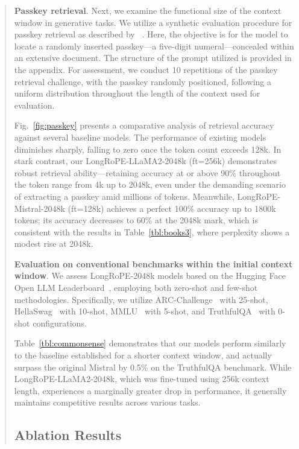 \begin{abstract}
\textbf{Passkey retrieval}. Next, we examine the functional size of the context window in generative tasks. We utilize a synthetic evaluation procedure for passkey retrieval as described by ~\cite{passkey}. Here, the objective is for the model to locate a randomly inserted passkey—a five-digit numeral—concealed within an extensive document. The structure of the prompt utilized is provided in the appendix. For assessment, we conduct 10 repetitions of the passkey retrieval challenge, with the passkey randomly positioned, following a uniform distribution throughout the length of the context used for evaluation.

Fig.~\ref{fig:passkey} presents a comparative analysis of retrieval accuracy against several baseline models. The performance of existing models diminishes sharply, falling to zero once the token count exceeds 128k. In stark contrast, our LongRoPE-LLaMA2-2048k (ft=256k) demonstrates robust retrieval ability—retaining accuracy at or above 90\% throughout the token range from 4k up to 2048k, even under the demanding scenario of extracting a passkey amid millions of tokens. Meanwhile, LongRoPE-Mistral-2048k (ft=128k) achieves a perfect 100\% accuracy up to 1800k tokens; its accuracy decreases to 60\% at the 2048k mark, which is consistent with the results in Table~\ref{tbl:books3}, where perplexity shows a modest rise at 2048k.

\textbf{Evaluation on conventional benchmarks within the initial context window}. We assess LongRoPE-2048k models based on the Hugging Face Open LLM Leaderboard~\cite{huggingfaceboard}, employing both zero-shot and few-shot methodologies. Specifically, we utilize ARC-Challenge~\cite{allenai:arc} with 25-shot, HellaSwag~\cite{zellers2019hellaswag} with 10-shot, MMLU~\cite{mmlu} with 5-shot, and TruthfulQA~\cite{lin2021truthfulqa} with 0-shot configurations.

Table~\ref{tbl:commonsense} demonstrates that our models perform similarly to the baseline established for a shorter context window, and actually surpass the original Mistral by 0.5\% on the TruthfulQA benchmark. While LongRoPE-LLaMA2-2048k, which was fine-tuned using 256k context length, experiences a marginally greater drop in performance, it generally maintains competitive results across various tasks.

\subsection{Ablation Results}


\end{abstract}
